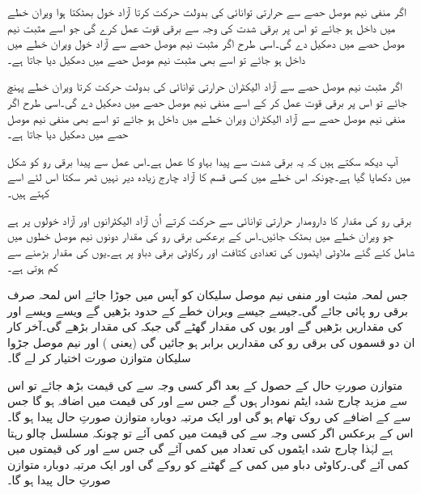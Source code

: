 اگر منفی نیم موصل حصے سے حرارتی توانائی کی بدولت حرکت کرتا آزاد  خول بھٹکتا ہوا ویران خطے میں داخل ہو جائے تو اس پر برقی شدت کی وجہ سے برقی قوت   عمل کرے گی جو اسے مثبت نیم موصل حصے میں دھکیل دے گی۔اسی طرح اگر مثبت نیم موصل حصے سے آزاد خول ویران خطے میں داخل ہو جائے تو اسے بھی مثبت نیم موصل حصے میں دھکیل دیا جاتا ہے۔ 

اگر مثبت نیم موصل حصے سے آزاد الیکٹران حرارتی توانائی کی بدولت حرکت کرتا ویران خطے پہنچ جائے تو اس پر برقی قوت   عمل کر کے اسے منفی نیم موصل حصے میں دھکیل دے گی۔اسی طرح اگر منفی نیم موصل حصے سے آزاد الیکٹران ویران خطے میں داخل ہو جائے تو اسے بھی منفی نیم موصل حصے میں دھکیل دیا جاتا ہے۔ 

آپ دیکھ سکتے ہیں کہ یہ برقی شدت سے پیدا بہاو کا عمل ہے۔اس عمل سے پیدا برقی رو  کو شکل میں دکھایا گیا ہے۔چونکہ اس خطے میں کسی قسم کا آزاد چارج زیادہ دیر نہیں ٹھر سکتا اس لئے اسے  کہتے ہیں۔

برقی رو  کی مقدار کا دارومدار حرارتی توانائی سے حرکت کرتے اُن آزاد الیکٹرانوں اور آزاد خولوں پر ہے جو ویران خطے میں بھٹک جائیں۔اس کے برعکس برقی رو  کی مقدار دونوں نیم موصل خطوں میں شامل کئے گئے ملاوٹی ایٹموں کی تعدادی کثافت اور رکاوٹی برقی دباو  پر ہے۔یوں  کی مقدار  بڑھنے سے کم ہوتی ہے۔

جس لمحہ مثبت اور منفی نیم موصل سلیکان کو آپس میں جوڑا جائے اس لمحہ صرف  برقی رو پائی جائے گی۔جیسے جیسے ویران خطے کے حدود بڑھیں گے ویسے ویسے    اور  کی مقداریں بڑھیں گے اور یوں  کی مقدار گھٹے گی جبکہ  کی مقدار بڑھے گی۔آخر کار ان دو قسموں کی برقی رو کی مقداریں برابر ہو جائیں گی (یعنی  )  اور نیم موصل جڑوا سلیکان متوازن صورت اختیار کر لے گا۔

متوازن صورتِ حال کے حصول کے بعد اگر کسی وجہ سے  کی قیمت بڑھ جائے تو اس سے مزید چارج شدہ ایٹم نمودار ہوں گے جس سے  اور  کی قیمت میں اضافہ ہو گا جس سے   کے اضافے کی روک تھام ہو گی اور ایک مرتبہ دوبارہ متوازن صورتِ حال پیدا ہو گا۔اس کے برعکس اگر کسی وجہ سے   کی قیمت میں کمی آئے تو چونکہ   مسلسل چالو رہتا ہے لہٰذا چارج شدہ ایٹموں کی تعداد میں کمی آئے گی جس سے   اور  کی قیمتوں میں کمی آئے گی۔رکاوٹی دباو میں کمی   کے گھٹنے کو روکے گی اور ایک مرتبہ دوبارہ متوازن صورتِ حال پیدا ہو گا۔

